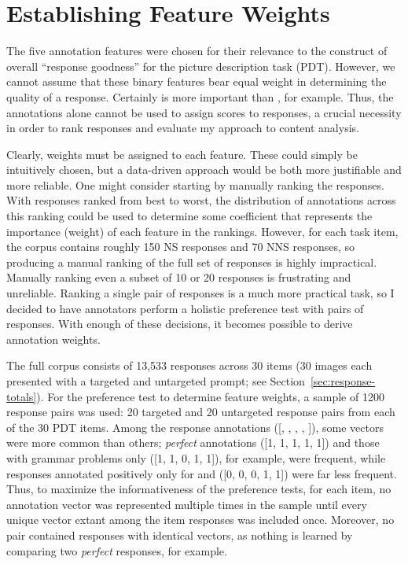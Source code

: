 \section{Establishing Feature Weights}
\label{sec:est-feat-weights}

The five annotation features were chosen for their relevance to the construct of overall ``response goodness'' for the picture description task (PDT). However, we cannot assume that these binary features bear equal weight in determining the quality of a response. Certainly  is more important than , for example. Thus, the annotations alone cannot be used to assign scores to responses, a crucial necessity in order to rank responses and evaluate my approach to content analysis.

Clearly, weights must be assigned to each feature. These could simply be intuitively chosen, but a data-driven approach would be both more justifiable and more reliable. One might consider starting by manually ranking the responses. With responses ranked from best to worst, the distribution of annotations across this ranking could be used to determine some coefficient that represents the importance (weight) of each feature in the rankings. However, for each task item, the corpus contains roughly 150 NS responses and 70 NNS responses, so producing a manual ranking of the full set of responses is highly impractical. Manually ranking even a subset of 10 or 20 responses is frustrating and unreliable. Ranking a single pair of responses is a much more practical task, so I decided to have annotators perform a holistic preference test with pairs of responses. With enough of these decisions, it becomes possible to derive annotation weights.

The full corpus consists of 13,533 responses across 30 items (30 images each presented with a targeted and untargeted prompt; see Section~\ref{sec:response-totals}). For the preference test to determine feature weights, a sample of 1200 response pairs was used: 20 targeted and 20 untargeted response pairs from each of the 30 PDT items. Among the response annotations  ([, , , , ]), some vectors were more common than others; \textit{perfect} annotations ([1, 1, 1, 1, 1]) and those with grammar problems only ([1, 1, 0, 1, 1]), for example, were frequent, while responses annotated positively only for  and  ([0, 0, 0, 1, 1]) were far less frequent. Thus, to maximize the informativeness of the preference tests, for each item, no annotation vector was represented multiple times in the sample until every unique vector extant among the item responses was included once. Moreover, no pair contained responses with identical vectors, as nothing is learned by comparing two \textit{perfect} responses, for example.

